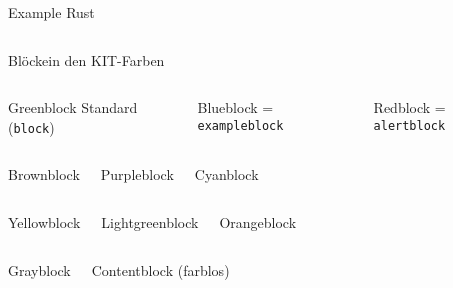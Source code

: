 \documentclass{sdqbeamer}
\begin{document}
\begin{frame}[fragile=singleslide]{Example Rust}
  \inputminted[fontsize=\footnotesize]{rust}{./rust-spec.rs}
\end{frame}

\begin{frame}{Blöcke}{in den KIT-Farben}
  \begin{columns}
    \begin{greenblock}{Greenblock}
      Standard (\texttt{block})
        \end{greenblock}
    \begin{blueblock}{Blueblock}
      = \texttt{exampleblock}
        \end{blueblock}
    \begin{redblock}{Redblock}
      = \texttt{alertblock}
        \end{redblock}
  \end{columns}
  \begin{columns}
        \begin{brownblock}{Brownblock}
        \end{brownblock}
        \begin{purpleblock}{Purpleblock}
        \end{purpleblock}
        \begin{cyanblock}{Cyanblock}
        \end{cyanblock}
  \end{columns}
  \begin{columns}
        \begin{yellowblock}{Yellowblock}
        \end{yellowblock}
        \begin{lightgreenblock}{Lightgreenblock}
        \end{lightgreenblock}
        \begin{orangeblock}{Orangeblock}
        \end{orangeblock}
  \end{columns}
  \begin{columns}
        \begin{grayblock}{Grayblock}
        \end{grayblock}
    \begin{contentblock}{Contentblock}
      (farblos)
    \end{contentblock}
  \end{columns}
\end{frame}
    
\end{document}
